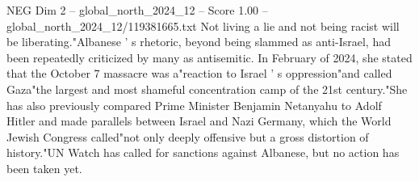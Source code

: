 \begin{textsample}{NEG Dim 2 – global\_north\_2024\_12 – Score 1.00 – global\_north\_2024\_12/119381665.txt}
Not living a lie and not being racist will be liberating."Albanese ' s rhetoric, beyond being slammed as anti-Israel, had been repeatedly criticized by many as antisemitic.
In February of 2024, she stated that the October 7 massacre was a"reaction to Israel ' s oppression"and called Gaza"the largest and most shameful concentration camp of the 21st century."She has also previously compared Prime Minister Benjamin Netanyahu to Adolf Hitler and made parallels between Israel and Nazi Germany, which the World Jewish Congress called"not only deeply offensive but a gross distortion of history."UN Watch has called for sanctions against Albanese, but no action has been taken yet.

\end{textsample}
